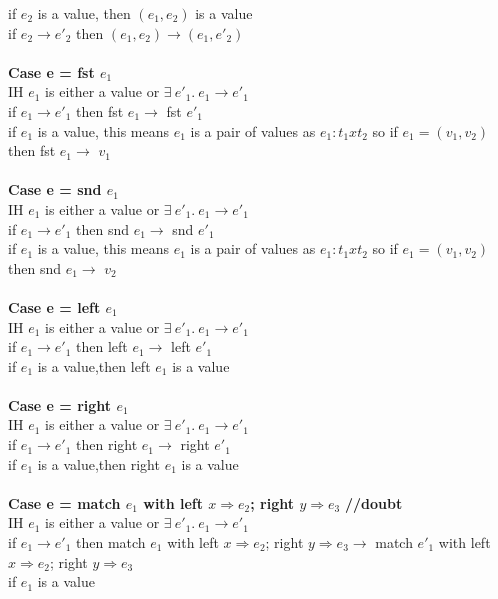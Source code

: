 \documentclass{article}
\begin{document}
if $e_2$ is a value, then $(e_1,e_2)$ is a value \\
if $e_2 \to e'_2$ then $(e_1,e_2) \to (e_1,e'_2)$ \\ \\
\textbf{Case e = fst $e_1$} \\
IH $e_1$ is either a value or $  \exists \ e'_1.\ e_1 \to e'_1 $ \\
if $e_1 \to e'_1$ then fst $e_1 \to$ fst $e'_1$\\
if $e_1$ is a value, this means $e_1$ is a pair of values as $e_1: t_1 x t_2$
 so if $e_1 = (v_1, v_2)$ then fst $e_1 \to$ $v_1$\\ \\
\textbf{Case e = snd $e_1$} \\
IH $e_1$ is either a value or $  \exists \ e'_1.\ e_1 \to e'_1 $ \\
if $e_1 \to e'_1$ then snd $e_1 \to$ snd $e'_1$\\
if $e_1$ is a value, this means $e_1$ is a pair of values as $e_1: t_1 x t_2$
 so if $e_1 = (v_1, v_2)$ then snd $e_1 \to$ $v_2$\\ \\
\textbf{Case e = left $e_1$} \\
IH $e_1$ is either a value or $  \exists \ e'_1.\ e_1 \to e'_1 $ \\
if $e_1 \to e'_1$ then left $e_1 \to$ left $e'_1$\\
if $e_1$ is a value,then left $e_1$ is a value\\ \\
\textbf{Case e = right $e_1$} \\
IH $e_1$ is either a value or $  \exists \ e'_1.\ e_1 \to e'_1 $ \\
if $e_1 \to e'_1$ then right $e_1 \to$ right $e'_1$\\
if $e_1$ is a value,then right $e_1$ is a value\\ \\
\textbf{Case e = match $e_1$ with left $x \Rightarrow e_2 $; right $ y \Rightarrow e_3$}   \textbf{//doubt}\\
IH $e_1$ is either a value or $  \exists \ e'_1.\ e_1 \to e'_1 $ \\
if $e_1 \to e'_1$ then match $e_1$ with left $x \Rightarrow e_2 $; right $ y \Rightarrow e_3 \to $ match $e'_1$ with left $x \Rightarrow e_2 $; right $ y \Rightarrow e_3$\\
if $e_1$ is a value \\ \\
\end{document}
